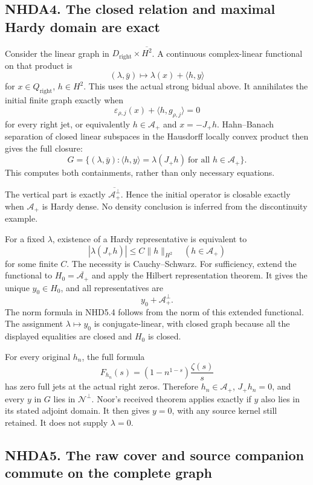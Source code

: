 \subsection{NHDA4. The closed relation and maximal Hardy domain are
exact}\label{nhda4.-the-closed-relation-and-maximal-hardy-domain-are-exact}

Consider the linear graph in \(D_{\mathrm{right}}\times\overline{H^2}\).
A continuous complex-linear functional on that product is \[
(\lambda,\bar y)\longmapsto\lambda(x)+\langle h,y\rangle
\] for \(x\in Q_{\mathrm{right}}\), \(h\in H^2\). This uses the actual
strong bidual above. It annihilates the initial finite graph exactly
when \[
\varepsilon_{\rho,j}(x)+\langle h,g_{\rho,j}\rangle=0
\] for every right jet, or equivalently \(h\in\mathscr A_+\) and
\(x=-J_+h\). Hahn--Banach separation of closed linear subspaces in the
Hausdorff locally convex product then gives the full closure: \[
G=\{(\lambda,\bar y):
\langle h,y\rangle=\lambda(J_+h)
\ \text{for all }h\in\mathscr A_+\}.
\] This computes both containments, rather than only necessary
equations.

The vertical part is exactly \(\overline{\mathscr A_+^\perp}\). Hence
the initial operator is closable exactly when \(\mathscr A_+\) is Hardy
dense. No density conclusion is inferred from the discontinuity example.

For a fixed \(\lambda\), existence of a Hardy representative is
equivalent to \[
|\lambda(J_+h)|\le C\|h\|_{H^2}
\quad(h\in\mathscr A_+)
\] for some finite \(C\). The necessity is Cauchy--Schwarz. For
sufficiency, extend the functional to \(H_0=\overline{\mathscr A_+}\)
and apply the Hilbert representation theorem. It gives the unique
\(y_0\in H_0\), and all representatives are \[
y_0+\mathscr A_+^\perp.
\] The norm formula in NHD5.4 follows from the norm of this extended
functional. The assignment \(\lambda\mapsto y_0\) is conjugate-linear,
with closed graph because all the displayed equalities are closed and
\(H_0\) is closed.

For every original \(h_n\), the full formula \[
F_{h_n}(s)=(1-n^{1-s})\frac{\zeta(s)}s
\] has zero full jets at the actual right zeros. Therefore
\(h_n\in\mathscr A_+\), \(J_+h_n=0\), and every \(y\) in \(G\) lies in
\(\mathcal N^\perp\). Noor's received theorem applies exactly if \(y\)
also lies in its stated adjoint domain. It then gives \(y=0\), with any
source kernel still retained. It does not supply \(\lambda=0\).

\subsection{NHDA5. The raw cover and source companion commute on the
complete
graph}\label{nhda5.-the-raw-cover-and-source-companion-commute-on-the-complete-graph}

